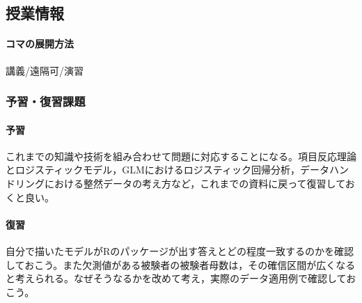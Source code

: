 \subsection{授業情報}
\paragraph{コマの展開方法}
講義/遠隔可/演習
\subsubsection{予習・復習課題}
\paragraph{予習} これまでの知識や技術を組み合わせて問題に対応することになる。項目反応理論とロジスティックモデル，GLMにおけるロジスティック回帰分析，データハンドリングにおける整然データの考え方など，これまでの資料に戻って復習しておくと良い。
\paragraph{復習} 自分で描いたモデルがRのパッケージが出す答えとどの程度一致するのかを確認しておこう。また欠測値がある被験者の被験者母数は，その確信区間が広くなると考えられる。なぜそうなるかを改めて考え，実際のデータ適用例で確認しておこう。